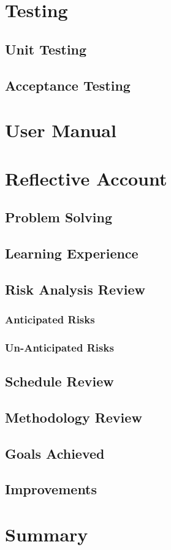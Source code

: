 \documentclass[11pt,a4paper]{article}
\begin{document}
\section{Testing}
\label{sec:testing}
\subsection{Unit Testing}
\label{sec:unit-testint}
\subsection{Acceptance Testing}
\label{sec:acceptance-testint}

\section{User Manual}
\label{sec:user-manual}

\section{Reflective Account}
\label{sec:reflective-account}
\subsection{Problem Solving}
\label{sec:problem-solving}
\subsection{Learning Experience}
\label{sec:learning-experience}
\subsection{Risk Analysis Review}
\label{sec:risk-analysis-review}
\subsubsection{Anticipated Risks}
\label{sec:anticipated-risks}
\subsubsection{Un-Anticipated Risks}
\label{sec:unanticipated-risks}
\subsection{Schedule Review}
\label{sec:schedule-review}
\subsection{Methodology Review}
\label{sec:methodology-review}
\subsection{Goals Achieved}
\label{sec:goals-achieved}
\subsection{Improvements}
\label{sec:improvements}

\section{Summary}
\label{sec:summary}

\newpage



\appendix
\end{document}
